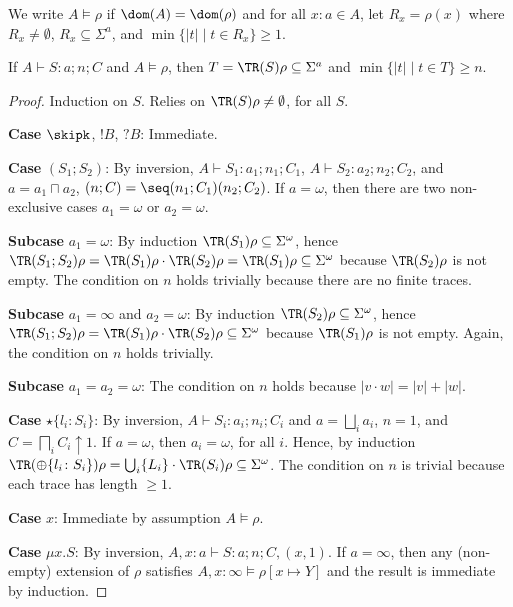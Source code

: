 We write $A \models \rho$ if $\dom (A) = \dom (\rho)$ and for all $x :a \in A$, let $R_x = \rho (x)$
where $R_x \ne \emptyset$, $R_x \subseteq \Sigma^a$, and $\min\{ |t| \mid t\in R_x \}\ge1$.

\begin{lemma}
  If $A \vdash S : a; n; C$ and $A \models \rho$, then $T = \TR (S) \rho \subseteq \Sigma^a$ and
  $\min\{ |t| \mid t \in T\} \ge n$.
\end{lemma}
\begin{proof}
  Induction on $S$. Relies on $\TR (S) \rho \ne \emptyset$, for all $S$.

  \textbf{Case }$\skipk$, $!B$, $?B$: Immediate.

  \textbf{Case }$(S_1;S_2)$: By inversion, $A \vdash S_1: a_1;n_1;C_1$, $A\vdash S_2:a_2;n_2;C_2$, and $a = a_1
  \sqcap a_2$, $(n;C) = \seq (n_1;C_1) (n_2;C_2)$.
  If $a=\omega$, then there are two non-exclusive cases $a_1=\omega$ or $a_2 = \omega$.

  \textbf{Subcase }$a_1 = \omega$: By induction $\TR (S_1) \rho \subseteq \Sigma^\omega$, hence $\TR
  (S_1;S_2)\rho = \TR (S_1)\rho \cdot \TR (S_2)\rho = \TR (S_1)\rho \subseteq \Sigma^\omega$ because $\TR (S_2)\rho$
  is not empty. The condition on $n$ holds trivially because there are no finite traces.

  \textbf{Subcase }$a_1 = \infty$ and $a_2 = \omega$: By induction $\TR (S_2) \rho \subseteq \Sigma^\omega$, hence  $\TR
  (S_1;S_2)\rho = \TR (S_1)\rho \cdot \TR (S_2)\rho \subseteq \Sigma^\omega$ because $\TR (S_1)\rho$
  is not empty. Again, the condition on $n$ holds trivially.

  \textbf{Subcase }$a_1 = a_2 = \omega$: The condition on $n$ holds because $|v\cdot w| = |v|+|w|$.

  \textbf{Case }$\star\{l_i\colon S_i\}$: By inversion, $A \vdash S_i : a_i; n_i; C_i$ and $a = \bigsqcup_i
  a_i$, $n=1$, and $C = \bigsqcap_i C_i \uparrow 1$.
  If $a=\omega$, then $a_i = \omega$, for all $i$. Hence, by induction $\TR (\oplus\{l_i\colon
  S_i\})\rho = \bigcup_i \{L_i\}\cdot\TR (S_i)\rho \subseteq \Sigma^\omega$. The condition on $n$ is
  trivial because each trace has length $\ge1$.

  \textbf{Case }$x$: Immediate by assumption $A \models \rho$.

  \textbf{Case }$\mu x.S$: By inversion, $A, x:a \vdash S:a;n;C,(x,1)$. If $a=\infty$, then any (non-empty)
  extension of $\rho$ satisfies $A, x:\infty \models \rho[x\mapsto Y]$ and the result is immediate by
  induction. 


\end{proof}
